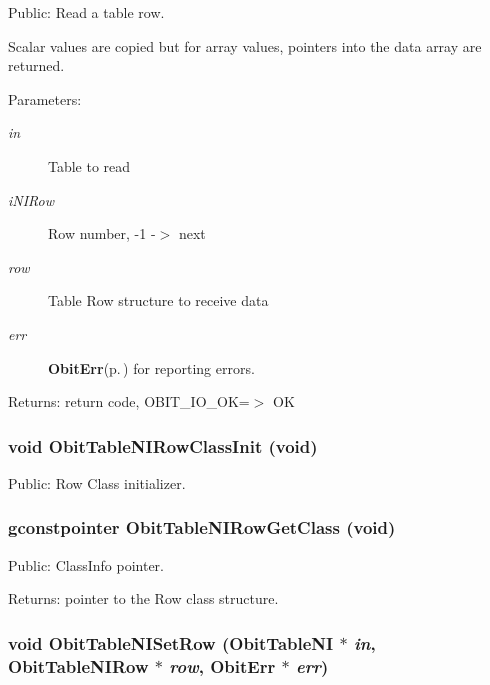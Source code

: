 Public: Read a table row. 

Scalar values are copied but for array values, pointers into the data array are returned. \begin{Desc}
\item[Parameters:]
\begin{description}
\item[{\em in}]Table to read \item[{\em i\-NIRow}]Row number, -1 -$>$ next \item[{\em row}]Table Row structure to receive data \item[{\em err}]{\bf Obit\-Err}{\rm (p.\,\pageref{structObitErr})} for reporting errors. \end{description}
\end{Desc}
\begin{Desc}
\item[Returns:]return code, OBIT\_\-IO\_\-OK=$>$ OK \end{Desc}
\subsubsection{\setlength{\rightskip}{0pt plus 5cm}void Obit\-Table\-NIRow\-Class\-Init (void)}\label{ObitTableNI_8h_a7}


Public: Row Class initializer. 

\subsubsection{\setlength{\rightskip}{0pt plus 5cm}gconstpointer Obit\-Table\-NIRow\-Get\-Class (void)}\label{ObitTableNI_8h_a9}


Public: Class\-Info pointer. 

\begin{Desc}
\item[Returns:]pointer to the Row class structure. \end{Desc}
\subsubsection{\setlength{\rightskip}{0pt plus 5cm}void Obit\-Table\-NISet\-Row ({\bf Obit\-Table\-NI} $\ast$ {\em in}, {\bf Obit\-Table\-NIRow} $\ast$ {\em row}, {\bf Obit\-Err} $\ast$ {\em err})}\label{ObitTableNI_8h_a19}


